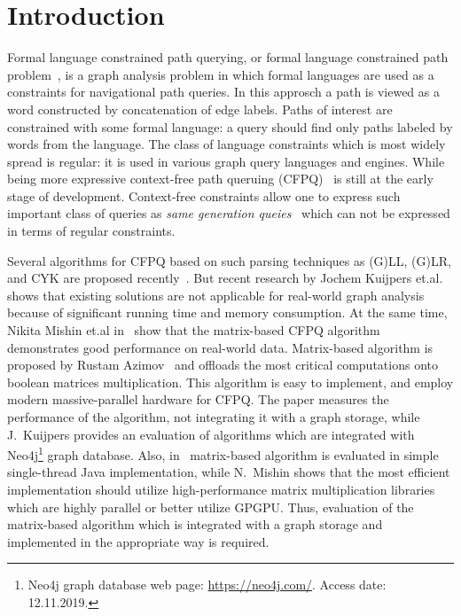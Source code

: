 \section{Introduction}

Formal language constrained path querying, or formal language constrained path problem~\cite{FLCpathProblem}, is a graph analysis problem in which formal languages are used as a constraints for navigational path queries.
In this approsch a path is viewed as a word constructed by concatenation of edge labels.
Paths of interest are constrained with some formal language: a query should find only paths labeled by words from the language.
The class of language constraints which is most widely spread is regular: it is used in various graph query languages and engines.
While being more expressive context-free path queruing (CFPQ)~\cite{Yannakakis} is still at the early stage of development.
Context-free constraints allow one to express such important class of queries as \textit{same generation queies}~\cite{FndDB} which can not be expressed in terms of regular constraints.

Several algorithms for CFPQ based on such parsing techniques as (G)LL, (G)LR, and CYK are proposed recently~\cite{bradford2007quickest,ward2008distributed,bradford2016fast,hellingsPathQuerying,Grigorev:2017:CPQ:3166094.3166104,Verbitskaia:2018:PCC:3241653.3241655,RDF,10.1007/978-3-319-91662-0_17,Medeiros:2018:EEC:3167132.3167265}.
But recent research by Jochem Kuijpers et.al.~\cite{Kuijpers:2019:ESC:3335783.3335791} shows that existing solutions are not applicable for real-world graph analysis because of significant running time and memory consumption.
At the same time, Nikita Mishin et.al in~\cite{Mishin:2019:ECP:3327964.3328503} show that the matrix-based CFPQ algorithm demonstrates good performance on real-world data.
Matrix-based algorithm is proposed by Rustam Azimov~\cite{Azimov:2018:CPQ:3210259.3210264} and offloads the most critical computations onto boolean matrices multiplication.
This algorithm is easy to implement, and employ modern massive-parallel hardware for CFPQ.
The paper measures the performance of the algorithm, not integrating it with a graph storage, while J.~Kuijpers provides an evaluation of algorithms which are integrated with Neo4j\footnote{Neo4j graph database web page: \url{https://neo4j.com/}. Access date: 12.11.2019.} graph database.
Also, in~\cite{Kuijpers:2019:ESC:3335783.3335791} matrix-based algorithm is evaluated in simple single-thread Java implementation, while N.~Mishin shows that the most efficient implementation should utilize high-performance matrix multiplication libraries which are highly parallel or better utilize GPGPU.
Thus, evaluation of the matrix-based algorithm which is integrated with a graph storage and implemented in the appropriate way is required.

